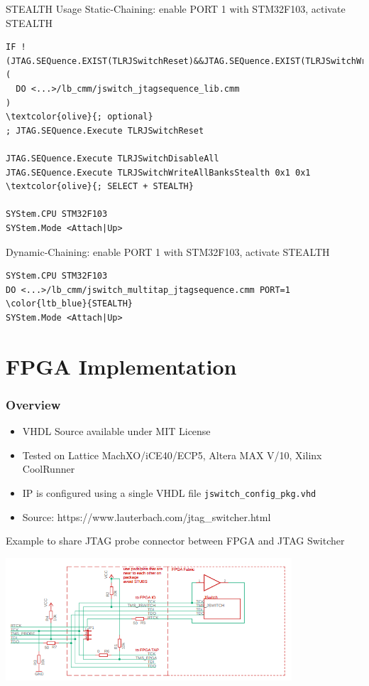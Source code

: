 \documentclass[aspectratio=169,12pt]{beamer}
\begin{document}
\begin{frame}[fragile]{STEALTH Usage}
Static-Chaining: enable PORT 1 with STM32F103, activate STEALTH
\begin{Verbatim}[fontsize=\tiny,commandchars=\\\{\}]
IF !(JTAG.SEQuence.EXIST(TLRJSwitchReset)&&JTAG.SEQuence.EXIST(TLRJSwitchWriteReg))
(
  DO <...>/lb_cmm/jswitch_jtagsequence_lib.cmm
)
\textcolor{olive}{; optional}
; JTAG.SEQuence.Execute TLRJSwitchReset

JTAG.SEQuence.Execute TLRJSwitchDisableAll
JTAG.SEQuence.Execute TLRJSwitchWriteAllBanksStealth 0x1 0x1 \textcolor{olive}{; SELECT + STEALTH}

SYStem.CPU STM32F103
SYStem.Mode <Attach|Up>
\end{Verbatim}
Dynamic-Chaining: enable PORT 1 with STM32F103, activate STEALTH
\begin{Verbatim}[fontsize=\tiny,commandchars=\\\{\}]
SYStem.CPU STM32F103
DO <...>/lb_cmm/jswitch_multitap_jtagsequence.cmm PORT=1 \color{ltb_blue}{STEALTH}
SYStem.Mode <Attach|Up>
\end{Verbatim}
\end{frame}

\section{FPGA Implementation}
\begin{frame}
\frametitle{Overview}
\end{frame}
\begin{frame}
\begin{itemize}
\item VHDL Source available under MIT License
\item Tested on Lattice MachXO/iCE40/ECP5, Altera MAX V/10, Xilinx CoolRunner
\item IP is configured using a single VHDL file \texttt{jswitch\_config\_pkg.vhd}
\item Source: https://www.lauterbach.com/jtag\_switcher.html
\end{itemize}
\end{frame}

\begin{frame}
Example to share JTAG probe connector between FPGA and JTAG Switcher
\begin{center}
\includegraphics[width=0.8\textwidth]{../png/fpga_taps_parallel.png}
\end{center}
\end{frame}
\end{document}
